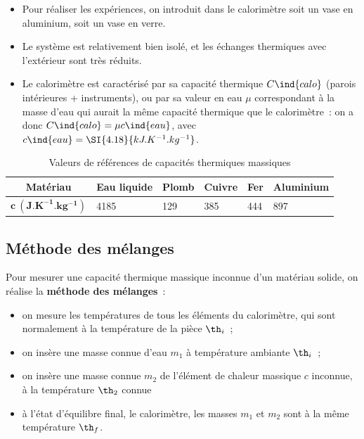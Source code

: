 \documentclass[../main/main.tex]{subfiles}
\begin{document}
{\begin{itemize}
		\item Pour réaliser les expériences, on introduit dans le calorimètre soit
		      un vase en aluminium, soit un vase en verre.
		\item Le système est relativement bien isolé, et les échanges thermiques
		      avec l'extérieur sont très réduits.
		\item Le calorimètre est caractérisé par sa capacité thermique $C\ind{calo}$
		      (parois intérieures + instruments), ou par sa valeur en eau $\mu$
		      correspondant à la masse d'eau qui aurait la même capacité thermique que
		      le calorimètre~: on a donc $C\ind{calo} = \mu c\ind{eau}$, avec
		      $c\ind{eau} = \SI{4.18}{kJ.K^{-1}.kg^{-1}}$.
	\end{itemize}

	\begin{table}[htbp]
		\centering
		\caption{Valeurs de références de capacités thermiques massiques}
		\begin{tabularx}{.9\linewidth}{cYYYYY}
			\toprule
			\textbf{Matériau}                    &
			Eau liquide                          &
			Plomb                                &
			Cuivre                               &
			Fer                                  &
			Aluminium
			\\
			\midrule
			$\mathbf{c~(\si{J.K^{-1}.kg^{-1}})}$ &
			\num{4185}                           &
			\num{129}                            &
			\num{385}                            &
			\num{444}                            &
			\num{897}
			\\
			\bottomrule
		\end{tabularx}
		\label{tab:cref}
	\end{table}

	\subsection{Méthode des mélanges}
	Pour mesurer une capacité thermique massique  inconnue d'un matériau solide, on réalise la
	\textbf{méthode des mélanges}~:
	\begin{itemize}
		\item on mesure les températures de tous les éléments du calorimètre, qui
		      sont normalement à la température de la pièce $\th_i$~;
		\item on insère une masse connue d'eau $m_1$ à température ambiante
		      $\th_i$~;
		\item on insère une masse connue $m_2$ de l'élément de chaleur massique
		      $c$ inconnue, à la température $\th_2$ connue
		\item à l'état d'équilibre final, le calorimètre, les masses $m_1$ et
		      $m_2$ sont à la même température $\th_f$.
	\end{itemize}

}
\end{document}
